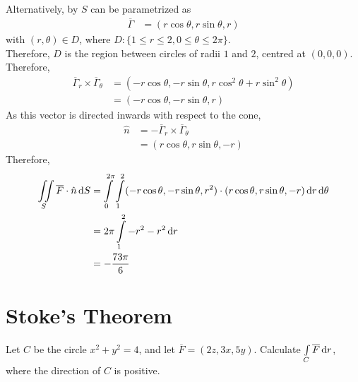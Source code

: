 \documentclass[fleqn, a4paper, 12pt, twoside]{article}
\theoremstyle{definition}
\theoremstyle{theorem}
\begin{document}
\begin{solution}
\begin{align*}
	\end{align*}
	~\\
	Alternatively, by $S$ can be parametrized as
	\begin{align*}
		\overline{\Gamma} & = (r \cos \theta , r \sin \theta , r)
	\end{align*}
	with $(r,\theta) \in D$, where $D : \{1 \le r \le 2 , 0 \le \theta \le 2 \pi \}$.\\
	Therefore, $D$ is the region between circles of radii $1$ and $2$, centred at $(0,0,0)$.\\
	Therefore,
	\begin{align*}
		\overline{\Gamma}_r \times \overline{\Gamma}_{\theta} & = (-r \cos \theta , -r \sin \theta , r \cos^2 \theta + r \sin^2 \theta) \\
                                                                        & = (-r \cos \theta , -r \sin \theta , r)
	\end{align*}
	As this vector is directed inwards with respect to the cone,
	\begin{align*}
		\hat{n} & = -\overline{\Gamma}_r \times \overline{\Gamma}_{\theta} \\
                        & = (r \cos \theta , r \sin \theta , -r)
	\end{align*}
	Therefore,
	\begin{align*}
		\iint\limits_{S} \overline{F} \cdot \hat{n} \dif S & = \int\limits_{0}^{2 \pi} \int\limits_{1}^{2} (-r \cos \theta , -r \sin \theta , r^2) \cdot (r \cos \theta , r \sin \theta , -r) \dif r \dif \theta \\
                                                                   & = 2 \pi \int\limits_{1}^{2} -r^2 - r^2 \dif r                                                                                                       \\
                                                                   & = -\frac{73 \pi}{6}
	\end{align*}
\end{solution}

\section{Stoke's Theorem}

\begin{question}
	Let $C$ be the circle $x^2 + y^2 = 4$, and let $\overline{F} = (2 z,3 x,5 y)$.
	Calculate $\int\limits_{C} \overline{F} \dif r$, where the direction of $C$ is positive.
\end{question}
\end{document}
